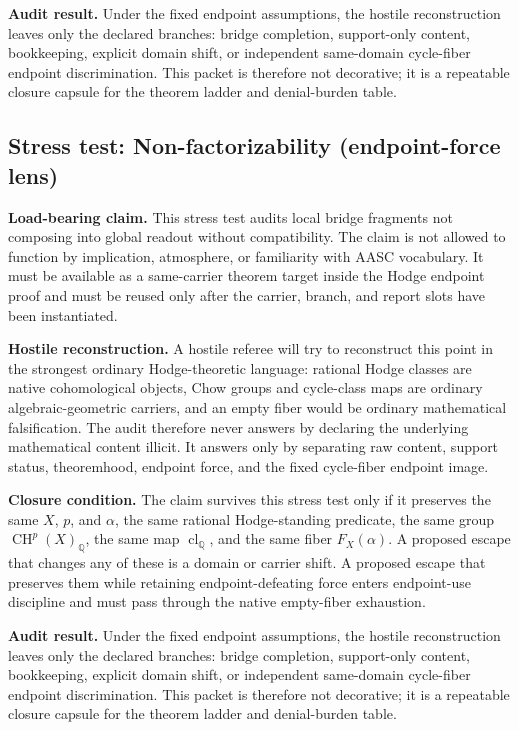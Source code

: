 \documentclass[11pt]{article}
\newcommand{\QQ}{\mathbb{Q}}
\newcommand{\CH}{\operatorname{CH}}
\newcommand{\clQ}{\operatorname{cl}_{\QQ}}
\begin{document}
\par\noindent\textbf{Audit result.} Under the fixed endpoint assumptions, the hostile reconstruction leaves only the declared branches: bridge completion, support-only content, bookkeeping, explicit domain shift, or independent same-domain cycle-fiber endpoint discrimination. This packet is therefore not decorative; it is a repeatable closure capsule for the theorem ladder and denial-burden table.


\subsection{Stress test: Non-factorizability (endpoint-force lens)}

\par\noindent\textbf{Load-bearing claim.} This stress test audits local bridge fragments not composing into global readout without compatibility. The claim is not allowed to function by implication, atmosphere, or familiarity with AASC vocabulary. It must be available as a same-carrier theorem target inside the Hodge endpoint proof and must be reused only after the carrier, branch, and report slots have been instantiated.

\par\noindent\textbf{Hostile reconstruction.} A hostile referee will try to reconstruct this point in the strongest ordinary Hodge-theoretic language: rational Hodge classes are native cohomological objects, Chow groups and cycle-class maps are ordinary algebraic-geometric carriers, and an empty fiber would be ordinary mathematical falsification. The audit therefore never answers by declaring the underlying mathematical content illicit. It answers only by separating raw content, support status, theoremhood, endpoint force, and the fixed cycle-fiber endpoint image.

\par\noindent\textbf{Closure condition.} The claim survives this stress test only if it preserves the same $X$, $p$, and $\alpha$, the same rational Hodge-standing predicate, the same group $\CH^p(X)_\QQ$, the same map $\clQ$, and the same fiber $F_X(\alpha)$. A proposed escape that changes any of these is a domain or carrier shift. A proposed escape that preserves them while retaining endpoint-defeating force enters endpoint-use discipline and must pass through the native empty-fiber exhaustion.

\par\noindent\textbf{Audit result.} Under the fixed endpoint assumptions, the hostile reconstruction leaves only the declared branches: bridge completion, support-only content, bookkeeping, explicit domain shift, or independent same-domain cycle-fiber endpoint discrimination. This packet is therefore not decorative; it is a repeatable closure capsule for the theorem ladder and denial-burden table.
\end{document}
